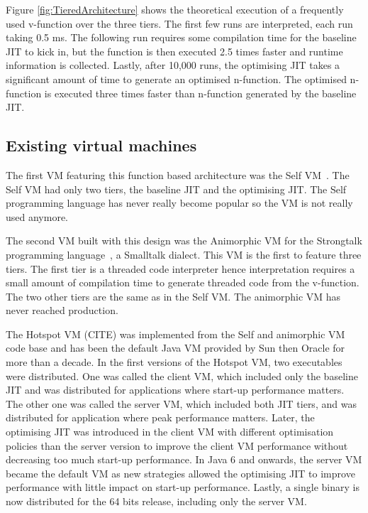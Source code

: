 \documentclass[a4paper,12pt,twoside]{../includes/ThesisStyle}
\begin{document}
Figure \ref{fig:TieredArchitecture} shows the theoretical execution of a frequently used v-function over the three tiers. The first few runs are interpreted, each run taking 0.5 ms. The following run requires some compilation time for the baseline JIT to kick in, but the function is then executed 2.5 times faster and runtime information is collected. Lastly, after 10,000 runs, the optimising JIT takes a significant amount of time to generate an optimised n-function. The optimised n-function is executed three times faster than n-function generated by the baseline JIT.

\subsection{Existing virtual machines}
\label{sec:existing1}

The first VM featuring this function based architecture was the Self VM~\cite{UrsPHD}. The Self VM had only two tiers, the baseline JIT and the optimising JIT. The Self programming language has never really become popular so the VM is not really used anymore. 

The second VM built with this design was the Animorphic VM for the Strongtalk programming language~\cite{Sun06}, a Smalltalk dialect. This VM is the first to feature three tiers. The first tier is a threaded code interpreter hence interpretation requires a small amount of compilation time to generate threaded code from the v-function. The two other tiers are the same as in the Self VM. The animorphic VM has never reached production.

The Hotspot VM (CITE) was implemented from the Self and animorphic VM code base and has been the default Java VM provided by Sun then Oracle for more than a decade. In the first versions of the Hotspot VM, two executables were distributed. One was called the client VM, which included only the baseline JIT and was distributed for applications where start-up performance matters. The other one was called the server VM, which included both JIT tiers, and was distributed for application where peak performance matters. Later, the optimising JIT was introduced in the client VM with different optimisation policies than the server version to improve the client VM performance without decreasing too much start-up performance. In Java 6 and onwards, the server VM became the default VM as new strategies allowed the optimising JIT to improve performance with little impact on start-up performance. Lastly, a single binary is now distributed for the 64 bits release, including only the server VM. 
\end{document}
